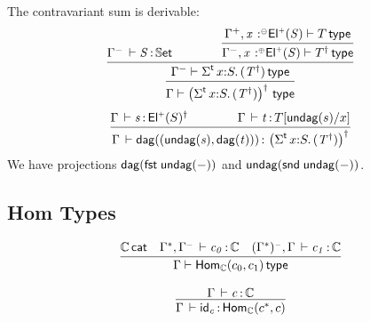 \documentclass[11pt]{article}
\theoremstyle{plain}
\begin{document}
The contravariant sum is derivable:
\begin{equation}
	\infer{
		\wftp{ \Gamma }{ \paren{\sigmatp{x}{S}{(T^\dagger)}}^\dagger }
	}{
		\infer{
			\wftp{ \Gamma^- }{ \sigmatp{x}{S}{(T^\dagger)} }
		}{
			\ofdtp{ \Gamma^- }{ S }{ \types }
			\qquad \qquad
			\infer{
				\wftp{\Gamma^-, \tptmv{x}{\coc}{\Elp S}}{T^\dagger}
			}{
				\wftp{\Gamma^+, \tptmv{x}{\conc}{\Elp S}}{T}
			}
		}	
	}
\end{equation}
\begin{equation}
	\infer{
		\oftp{\Gamma}{\dagtm{(\undag s, \dagtm t)}}{ \paren{\sigmatp{x}{S}{(T^\dagger)}}^\dagger }
	}{
		\oftp{\Gamma}{s}{\Elp S^\dagger}
		\qquad \qquad
		\oftp{\Gamma}{t}{\subst T {\undag s} x}
	}
\end{equation}
We have projections $\mathsf{dag}(\mathit{\mathsf{fst}_{} \: \mathsf{undag}(-)})$ and $\mathsf{undag}(\mathit{\mathsf{snd}_{} \: \mathsf{undag}(-)})$.

\subsection{Hom Types}

\[
\begin{array}{c}
\infer{\wftp{\Gamma}{\Hom{\C}{c_0}{c_1}}}
      {\wfdtp{\C} &
        \oftp{\Gamma^*,\Gamma^\con}{c_0}{\C} & 
        \oftp{(\Gamma^*)^\con,\Gamma}{c_1}{\C} 
      }
\\ \\
\infer{\oftp{\Gamma}{\idm{c}}{\Hom{\C}{c^*}{c}}}
      {\oftp{\Gamma}{c}{\C}
      }
\end{array}
\]

\end{document}

